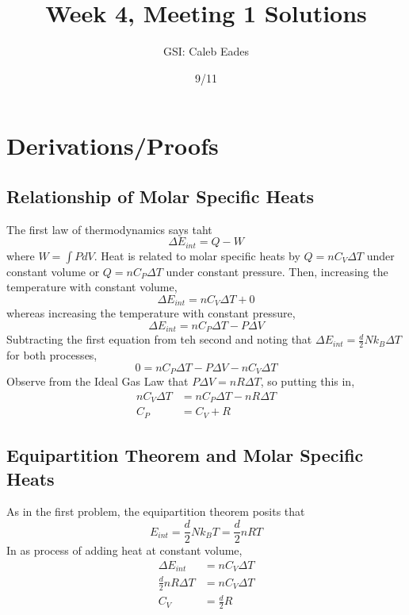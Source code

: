\documentclass{article}
\begin{document}
	
\title{Week 4, Meeting 1 Solutions}
\author{GSI: Caleb Eades}
\date{9/11}
\maketitle

\section{Derivations/Proofs}

\subsection{Relationship of Molar Specific Heats}

The first law of thermodynamics says taht
\begin{equation}
\Delta E_{int} = Q-W
\end{equation}
where $W=\int PdV$. Heat is related to molar specific heats by $Q=nC_V\Delta T$ under constant volume or $Q=nC_P\Delta T$ under constant pressure. Then, increasing the temperature with constant volume,
\begin{equation}
\Delta E_{int} = nC_V\Delta T + 0
\end{equation}
whereas increasing the temperature with constant pressure,
\begin{equation}
\Delta E_{int} = nC_P\Delta T - P\Delta V
\end{equation}
Subtracting the first equation from teh second and noting that $\Delta E_{int} = \frac{d}{2}Nk_B\Delta T$ for both processes,
\begin{equation}
0 = nC_P\Delta T - P\Delta V - nC_V\Delta T
\end{equation}
Observe from the Ideal Gas Law that $P\Delta V = nR\Delta T$, so putting this in,
\begin{align*}
nC_V\Delta T &= nC_P\Delta T - nR\Delta T \\
C_P &= C_V + R
\end{align*}

\subsection{Equipartition Theorem and Molar Specific Heats}

As in the first problem, the equipartition theorem posits that
\begin{equation}
E_{int} = \frac{d}{2}Nk_B T = \frac{d}{2}nRT
\end{equation}
In as process of adding heat at constant volume,
\begin{align*}
\Delta E_{int} &= nC_V \Delta T \\
\frac{d}{2}nR\Delta T &= nC_V\Delta T \\
C_V &= \frac{d}{2}R
\end{align*}
\end{document}
